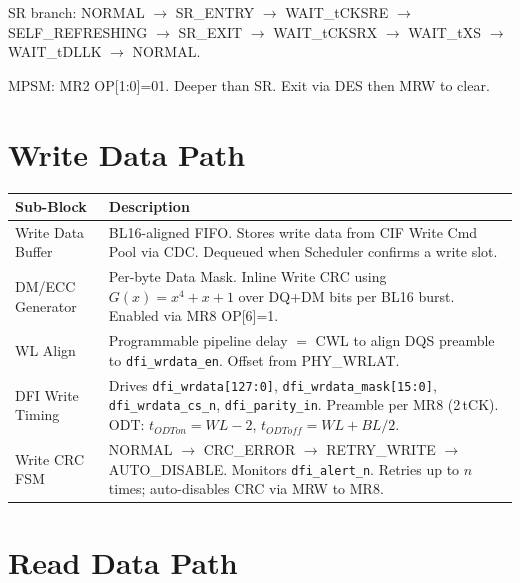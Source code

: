 \documentclass[10pt,a4paper]{article}
\newcommand{\Th}[1]{\cellcolor{thbg}\textbf{\small\color{acc1}#1}}
\newcommand{\RA}{\rowcolor{white}}
\newcommand{\RB}{\rowcolor{altbg}}
\begin{document}
SR branch: NORMAL $\to$ SR\_ENTRY $\to$ WAIT\_tCKSRE $\to$ SELF\_REFRESHING $\to$
SR\_EXIT $\to$ WAIT\_tCKSRX $\to$ WAIT\_tXS $\to$ WAIT\_tDLLK $\to$ NORMAL.

MPSM: MR2 OP[1:0]=01. Deeper than SR. Exit via DES then MRW to clear.

\section{Write Data Path}

\begin{center}
\begin{tabularx}{\linewidth}{@{} l X @{}}
\toprule
\Th{Sub-Block} & \Th{Description} \\
\midrule
\RA Write Data Buffer & BL16-aligned FIFO. Stores write data from CIF Write Cmd Pool via CDC.
  Dequeued when Scheduler confirms a write slot. \\
\RB DM/ECC Generator & Per-byte Data Mask. Inline Write CRC using $G(x)=x^4+x+1$ over DQ+DM
  bits per BL16 burst. Enabled via MR8 OP[6]=1. \\
\RA WL Align & Programmable pipeline delay $=$ CWL to align DQS preamble to
  \texttt{dfi\_wrdata\_en}. Offset from PHY\_WRLAT. \\
\RB DFI Write Timing & Drives \texttt{dfi\_wrdata[127:0]}, \texttt{dfi\_wrdata\_mask[15:0]},
  \texttt{dfi\_wrdata\_cs\_n}, \texttt{dfi\_parity\_in}. Preamble per MR8 (2\,tCK).
  ODT: $t_{ODTon}=WL-2$, $t_{ODToff}=WL+BL/2$. \\
\RA Write CRC FSM & NORMAL $\to$ CRC\_ERROR $\to$ RETRY\_WRITE $\to$ AUTO\_DISABLE.
  Monitors \texttt{dfi\_alert\_n}. Retries up to $n$ times; auto-disables CRC via MRW to MR8. \\
\bottomrule
\end{tabularx}
\end{center}

\section{Read Data Path}
\end{document}
